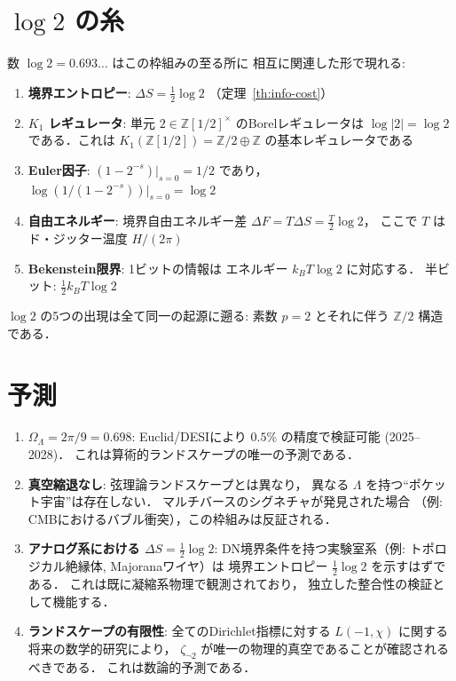 \documentclass[11pt,a4paper]{article}
\begin{document}
\section{$\log 2$ の糸}

数 $\log 2 = 0.693\ldots$ はこの枠組みの至る所に
相互に関連した形で現れる:

\begin{enumerate}
\item \textbf{境界エントロピー}: $\Delta S = \frac{1}{2}\log 2$
（定理~\ref{th:info-cost}）

\item \textbf{$K_1$ レギュレータ}: 単元
$2 \in \mathbb{Z}[1/2]^\times$ のBorelレギュレータは
$\log|2| = \log 2$ である．これは
$K_1(\mathbb{Z}[1/2]) = \mathbb{Z}/2 \oplus \mathbb{Z}$
の基本レギュレータである~\cite{Milnor1971}

\item \textbf{Euler因子}: $(1 - 2^{-s})|_{s=0} = 1/2$ であり，
$\log(1/(1-2^{-s}))|_{s=0} = \log 2$

\item \textbf{自由エネルギー}: 境界自由エネルギー差
$\Delta F = T \Delta S = \frac{T}{2}\log 2$，
ここで $T$ はド・ジッター温度 $H/(2\pi)$

\item \textbf{Bekenstein限界}: 1ビットの情報は
エネルギー $k_BT\log 2$ に対応する．
半ビット: $\frac{1}{2}k_BT\log 2$
\end{enumerate}

$\log 2$ の5つの出現は全て同一の起源に遡る:
素数 $p = 2$ とそれに伴う $\mathbb{Z}/2$ 構造である．

\section{予測}

\begin{enumerate}
\item \textbf{$\Omega_\Lambda = 2\pi/9 = 0.698$}:
Euclid/DESIにより $0.5\%$ の精度で検証可能 (2025--2028)．
これは算術的ランドスケープの唯一の予測である．

\item \textbf{真空縮退なし}: 弦理論ランドスケープとは異なり，
異なる $\Lambda$ を持つ``ポケット宇宙''は存在しない．
マルチバースのシグネチャが発見された場合
（例: CMBにおけるバブル衝突），この枠組みは反証される．

\item \textbf{アナログ系における $\Delta S = \frac{1}{2}\log 2$}:
DN境界条件を持つ実験室系（例: トポロジカル絶縁体, Majoranaワイヤ）は
境界エントロピー $\frac{1}{2}\log 2$ を示すはずである．
これは既に凝縮系物理で観測されており，
独立した整合性の検証として機能する．

\item \textbf{ランドスケープの有限性}: 全てのDirichlet指標に対する
$L(-1, \chi)$ に関する将来の数学的研究により，
$\zeta_{\neg 2}$ が唯一の物理的真空であることが確認されるべきである．
これは数論的予測である．
\end{enumerate}
\end{document}
